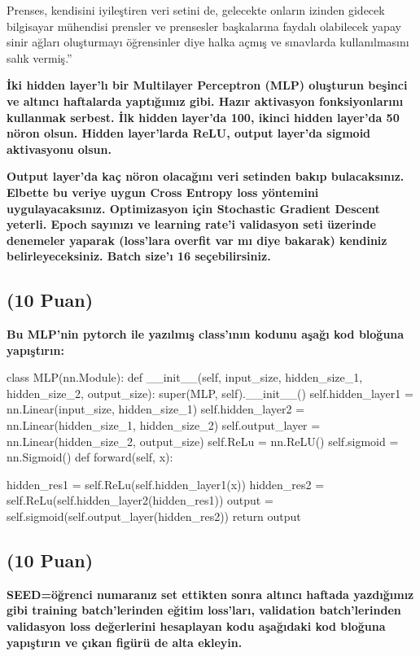 \documentclass[11pt]{article}
\begin{document}
Prenses, kendisini iyileştiren veri setini de, gelecekte onların izinden gidecek bilgisayar mühendisi prensler ve prensesler başkalarına faydalı olabilecek yapay sinir ağları oluşturmayı öğrensinler diye halka açmış ve sınavlarda kullanılmasını salık vermiş.''

\textbf{İki hidden layer'lı bir Multilayer Perceptron (MLP) oluşturun beşinci ve altıncı haftalarda yaptığımız gibi. Hazır aktivasyon fonksiyonlarını kullanmak serbest. İlk hidden layer'da 100, ikinci hidden layer'da 50 nöron olsun. Hidden layer'larda ReLU, output layer'da sigmoid aktivasyonu olsun.}

\textbf{Output layer'da kaç nöron olacağını veri setinden bakıp bulacaksınız. Elbette bu veriye uygun Cross Entropy loss yöntemini uygulayacaksınız. Optimizasyon için Stochastic Gradient Descent yeterli. Epoch sayınızı ve learning rate'i validasyon seti üzerinde denemeler yaparak (loss'lara overfit var mı diye bakarak) kendiniz belirleyeceksiniz. Batch size'ı 16 seçebilirsiniz.}

\subsection{(10 Puan)} \textbf{Bu MLP'nin pytorch ile yazılmış class'ının kodunu aşağı kod bloğuna yapıştırın:}

\begin{python}
class MLP(nn.Module):
    def __init__(self, input_size, hidden_size_1, hidden_size_2, output_size):
        super(MLP, self).__init__()
        self.hidden_layer1 = nn.Linear(input_size, hidden_size_1)
        self.hidden_layer2 = nn.Linear(hidden_size_1, hidden_size_2)
        self.output_layer = nn.Linear(hidden_size_2, output_size)
        self.ReLu = nn.ReLU()
        self.sigmoid = nn.Sigmoid()
    def forward(self, x):

        hidden_res1 = self.ReLu(self.hidden_layer1(x))
        hidden_res2 = self.ReLu(self.hidden_layer2(hidden_res1))
        output = self.sigmoid(self.output_layer(hidden_res2))
        return output
\end{python}

\subsection{(10 Puan)} \textbf{SEED=öğrenci numaranız set ettikten sonra altıncı haftada yazdığımız gibi training batch'lerinden eğitim loss'ları, validation batch'lerinden validasyon loss değerlerini hesaplayan kodu aşağıdaki kod bloğuna yapıştırın ve çıkan figürü de alta ekleyin.}
\end{document}
